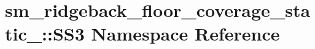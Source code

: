 \hypertarget{namespacesm__ridgeback__floor__coverage__static__1_1_1SS3}{}\section{sm\+\_\+ridgeback\+\_\+floor\+\_\+coverage\+\_\+static\+\_\+:\+:S\+S3 Namespace Reference}
\label{namespacesm__ridgeback__floor__coverage__static__1_1_1SS3}
